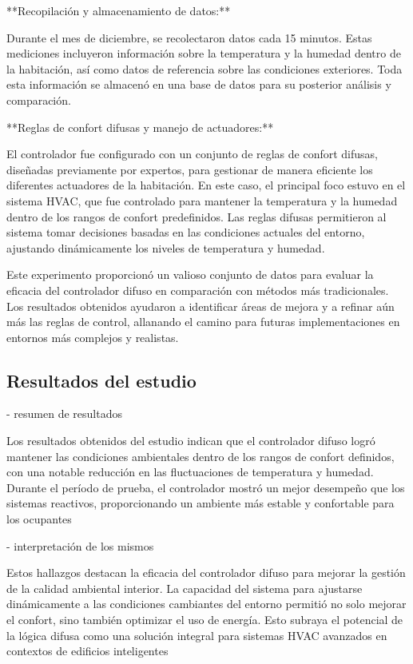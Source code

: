 **Recopilación y almacenamiento de datos:**

Durante el mes de diciembre, se recolectaron datos cada 15 minutos. Estas mediciones incluyeron información sobre la temperatura y la humedad dentro de la habitación, así como datos de referencia sobre las condiciones exteriores. Toda esta información se almacenó en una base de datos para su posterior análisis y comparación.

**Reglas de confort difusas y manejo de actuadores:**

El controlador fue configurado con un conjunto de reglas de confort difusas, diseñadas previamente por expertos, para gestionar de manera eficiente los diferentes actuadores de la habitación. En este caso, el principal foco estuvo en el sistema HVAC, que fue controlado para mantener la temperatura y la humedad dentro de los rangos de confort predefinidos. Las reglas difusas permitieron al sistema tomar decisiones basadas en las condiciones actuales del entorno, ajustando dinámicamente los niveles de temperatura y humedad.

Este experimento proporcionó un valioso conjunto de datos para evaluar la eficacia del controlador difuso en comparación con métodos más tradicionales. Los resultados obtenidos ayudaron a identificar áreas de mejora y a refinar aún más las reglas de control, allanando el camino para futuras implementaciones en entornos más complejos y realistas.

\subsection{Resultados del estudio}
- resumen de resultados

Los resultados obtenidos del estudio indican que el controlador difuso logró mantener las condiciones ambientales dentro de los rangos de confort definidos, con una notable reducción en las fluctuaciones de temperatura y humedad. Durante el período de prueba, el controlador mostró un mejor desempeño que los sistemas reactivos, proporcionando un ambiente más estable y confortable para los ocupantes

- interpretación de los mismos

Estos hallazgos destacan la eficacia del controlador difuso para mejorar la gestión de la calidad ambiental interior. La capacidad del sistema para ajustarse dinámicamente a las condiciones cambiantes del entorno permitió no solo mejorar el confort, sino también optimizar el uso de energía. Esto subraya el potencial de la lógica difusa como una solución integral para sistemas HVAC avanzados en contextos de edificios inteligentes

